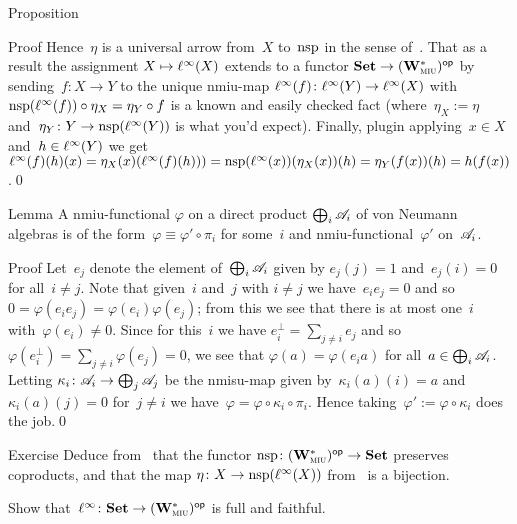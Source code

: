 \documentclass[a]{subfiles}
\begin{document}
\begin{parsec}
\begin{point}{Proposition}
\begin{point}{Proof}
Hence~$\eta$ is a universal arrow from~$X$
to~$\mathrm{nsp}$ in the sense of~.
That as a result the assignment $X\mapsto \ell^\infty(X)$
extends to a functor
$\mathbf{Set}\to{(\mathbf{W}^*_{\text{\textsc{miu}}})}{^{\mathsf{op}}}$
by sending~$f\colon X\to Y$
to the unique nmiu-map $\ell^\infty(f)\colon \ell^\infty(Y)\to\ell^\infty(X)$
with $\mathrm{nsp}(\ell^\infty(f))\circ \eta_X = \eta_Y\circ f$
is a known and easily checked fact
(where~$\eta_X:= \eta$ and~$\eta_Y\colon Y\to\mathrm{nsp}(\ell^\infty(Y))$ 
is what you'd expect).
Finally, plugin applying~$x\in X$ and~$h\in \ell^\infty(Y)$
we get
$ \ell^\infty(f)(h)(x)
= \eta_X(x)(\ell^\infty(f)(h)))
=\mathrm{nsp}(\ell^\infty(x))(\eta_X(x))(h)
=\eta_Y(f(x))(h)
=h(f(x))$.\qed
\end{point}
\end{point}
\begin{point}{Lemma}%
A nmiu-functional $\varphi$
on a direct product $\bigoplus_i \mathscr{A}_i$
of von Neumann algebras
is of the form~$\varphi\equiv \varphi'\circ \pi_i$
for some~$i$ and nmiu-functional~$\varphi'$ on~$\mathscr{A}_i$.
\begin{point}{Proof}%
Let~$e_j$ denote the element of~$\bigoplus_i \mathscr{A}_i$
given by $e_j(j)=1$ and~$e_j(i)=0$ for all~$i\neq j$.
Note that given~$i$ and~$j$ with $i\neq j$
we have~$e_ie_j=0$
and so~$0=\varphi(e_i e_j)=\varphi(e_i)\varphi(e_j)$;
from this we see that
there is at most one~$i$ with~$\varphi(e_i)\neq 0$.
Since for this~$i$
we have $e_i^\perp = \sum_{j\neq i} e_j$
and so~$\varphi(e_i^\perp)=\sum_{j\neq i} \varphi(e_j)=0$,
we see that $\varphi(a)=\varphi(e_i a )$
for all~$a\in \bigoplus_i \mathscr{A}_i$.
Letting  $\kappa_i\colon \mathscr{A}_i\to\bigoplus_j \mathscr{A}_j$
be the nmisu-map given by~$\kappa_i(a)(i)=a$
and~$\kappa_i(a)(j)=0$ for~$j\neq i$
we have~$\varphi = \varphi \circ \kappa_i \circ \pi_i$.
Hence taking~$\varphi':=\varphi\circ \kappa_i$
does the job.\qed
\end{point}
\end{point}
\begin{point}{Exercise}%
Deduce from~
that the functor $\mathrm{nsp}\colon {(\mathbf{W}^*_{\text{\textsc{miu}}})}{^{\mathsf{op}}}\to \mathbf{Set}$
preserves coproducts,
and that the 
map $\eta\colon X\to \mathrm{nsp}(\ell^\infty(X))$
from~ is a bijection.

Show that~$\ell^\infty\colon\mathbf{Set}\to {(\mathbf{W}^*_{\text{\textsc{miu}}})}{^{\mathsf{op}}}$
is full and faithful.
\end{point}

\end{parsec}
\end{document}
